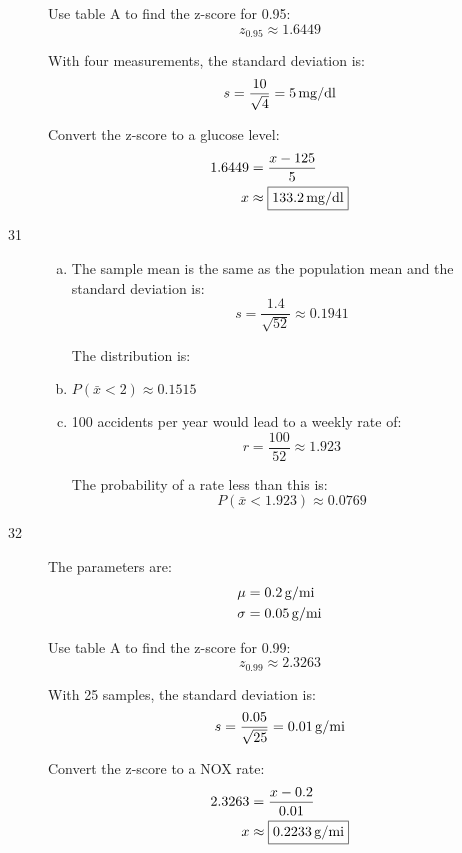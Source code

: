 \documentclass[letterpaper, landscape]{exam}
\begin{document}
\begin{description}
        Use table A to find the z-score for 0.95:
        \[
          z_{0.95} \approx 1.6449
        \]

        With four measurements, the standard deviation is:
        \[
          s = \frac{10}{\sqrt{4}} = \unit[5]{mg/dl}
        \]

        Convert the z-score to a glucose level:
        \begin{align*}
          1.6449 & = \frac{x - 125}{5} \\
          x      & \approx \boxed{ \unit[133.2]{mg/dl} } \\
        \end{align*}

      \item[31]
        \begin{enumerate}[(a)]
          \item The sample mean is the same as the population mean and the
            standard deviation is:
            \[
              s = \frac{1.4}{\sqrt{52}} \approx 0.1941
            \]

            The distribution is: 

          \item $P(\bar{x} < 2) \approx \boxed{ 0.1515 }$

          \item 100 accidents per year would lead to a weekly rate of:
            \[
              r = \frac{100}{52} \approx 1.923
            \]

            The probability of a rate less than this is:
            \[
              P(\bar{x} < 1.923) \approx \boxed{ 0.0769 }
            \]
        \end{enumerate}

      \item[32]
        The parameters are:
        \begin{align*}
          \mu    & = \unit[0.2]{g/mi} \\
          \sigma & = \unit[0.05]{g/mi} \\
        \end{align*}

        Use table A to find the z-score for 0.99:
        \[
          z_{0.99} \approx 2.3263
        \]

        With 25 samples, the standard deviation is:
        \[
          s = \frac{0.05}{\sqrt{25}} = \unit[0.01]{g/mi}
        \]

        Convert the z-score to a NOX rate:
        \begin{align*}
          2.3263 & = \frac{x - 0.2}{0.01} \\
          x     & \approx \boxed{ \unit[0.2233]{g/mi} } \\
        \end{align*}


\end{description}
\end{document}
